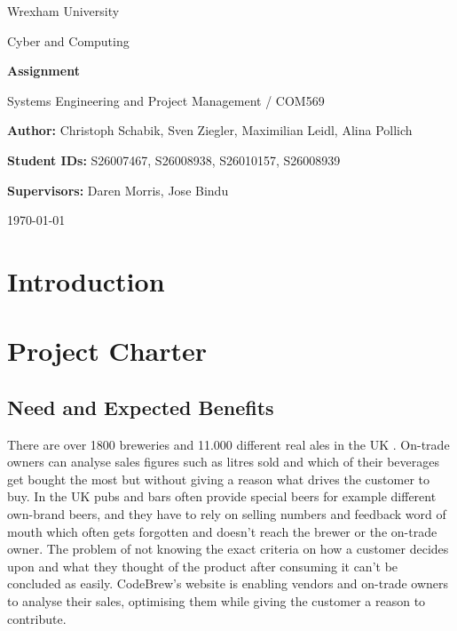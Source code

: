 \documentclass[a4paper,12pt]{article}
\title{\mytitle}
\author{\myname \\ Student ID: \mystudentid}
\date{\today}
\newcommand{\myname}{Christoph Schabik, Sven Ziegler, Maximilian Leidl, Alina Pollich}
\newcommand{\mystudentid}{S26007467, S26008938, S26010157, S26008939}
\newcommand{\mytitle}{Assignment}
\newcommand{\mycourse}{Systems Engineering and Project Management / COM569}
\newcommand{\mysupervisor}{Daren Morris, Jose Bindu}
\newcommand{\myuniversity}{Wrexham University}
\newcommand{\myfaculty}{Cyber and Computing}
\begin{document}
\begin{titlepage}
	\centering
	\vspace*{2cm}
	{\Large \myuniversity\par}
	\vspace{0.5cm}
	{\large \myfaculty\par}
	\vspace{2cm}
	{\Huge\bfseries \mytitle\par}
	\vspace{1.5cm}
	{\large \mycourse\par}
	\vspace{2cm}
	{\large \textbf{Author:} \myname\par}
	{\large \textbf{Student IDs:} \mystudentid\par}
	{\large \textbf{Supervisors:} \mysupervisor\par}
	\vfill
	{\large \today\par}
\end{titlepage}

\tableofcontents
\listoffigures
\listoftables
\newpage

\section{Introduction}

\section{Project Charter}

\subsection{Need and Expected Benefits}
There are over 1800 breweries \cite{hampsonCAMRABrewersWarn2026} and 11.000 different real ales in the UK \cite{smithBeerGuidePraises2015}.
On-trade owners can analyse sales figures such as litres sold and which of their beverages get bought the most but without giving a reason what drives the customer to buy.
In the UK pubs and bars often provide special beers for example different own-brand beers, and they have to rely on selling numbers and feedback word of mouth which often gets forgotten and doesn't reach the brewer or the on-trade owner.
The problem of not knowing the exact criteria on how a customer decides upon and what they thought of the product after consuming it can't be concluded as easily.
CodeBrew's website is enabling vendors and on-trade owners to analyse their sales, optimising them while giving the customer a reason to contribute.
\end{document}
